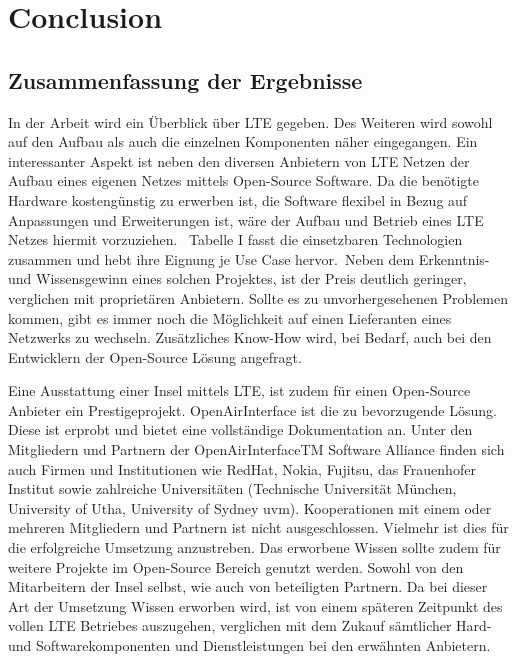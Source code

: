 
%
%
% 
% 
% 

\section{Conclusion}
\label{sec:conclusion}
\subsection{Zusammenfassung der Ergebnisse}
\label{subsec:zusammenfassung}
In der Arbeit wird ein Überblick über LTE gegeben. Des Weiteren wird sowohl auf den Aufbau als auch die einzelnen Komponenten näher eingegangen. Ein interessanter Aspekt ist neben den diversen Anbietern von LTE Netzen der Aufbau eines eigenen Netzes mittels Open-Source Software. Da die benötigte Hardware kostengünstig zu erwerben ist, die Software flexibel in Bezug auf Anpassungen und Erweiterungen ist, wäre der Aufbau und Betrieb eines LTE Netzes hiermit vorzuziehen.\ %
Tabelle I fasst die einsetzbaren Technologien zusammen und hebt ihre Eignung je Use Case hervor.\ Neben dem Erkenntnis- und Wissensgewinn eines solchen Projektes, ist der Preis deutlich geringer, verglichen mit proprietären Anbietern. Sollte es zu unvorhergesehenen Problemen kommen, gibt es immer noch die Möglichkeit auf einen Lieferanten eines Netzwerks zu wechseln. Zusätzliches Know-How wird, bei Bedarf, auch bei den Entwicklern der Open-Source Lösung angefragt. 

Eine Ausstattung einer Insel mittels LTE, ist zudem für einen Open-Source Anbieter ein Prestigeprojekt. OpenAirInterface ist die zu bevorzugende Lösung. Diese ist erprobt und bietet eine vollständige Dokumentation an. Unter den Mitgliedern und Partnern der OpenAirInterfaceTM Software Alliance finden sich auch Firmen und Institutionen wie RedHat, Nokia, Fujitsu, das Frauenhofer Institut sowie zahlreiche Universitäten (Technische Universität München, University of Utha, University of Sydney uvm). Kooperationen mit einem oder mehreren Mitgliedern und Partnern ist nicht ausgeschlossen. Vielmehr ist dies für die erfolgreiche Umsetzung anzustreben.
Das erworbene Wissen sollte zudem für weitere Projekte im Open-Source Bereich genutzt werden. Sowohl von den Mitarbeitern der Insel selbst, wie auch von beteiligten Partnern. Da bei dieser Art der Umsetzung Wissen erworben wird, ist von einem späteren Zeitpunkt des vollen LTE Betriebes auszugehen, verglichen mit dem Zukauf sämtlicher Hard- und Softwarekomponenten und Dienstleistungen bei den erwähnten Anbietern.

